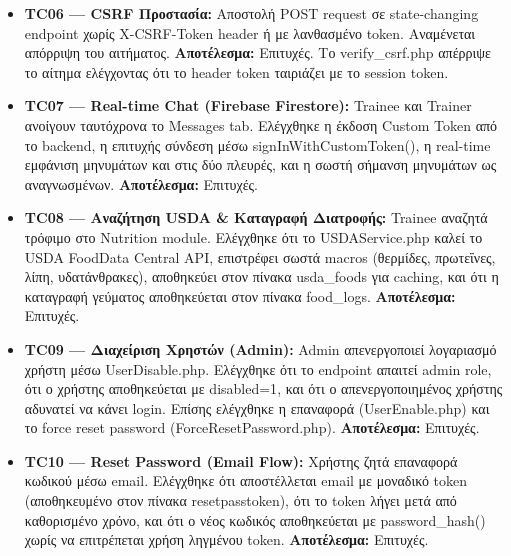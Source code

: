\documentclass[12pt,a4paper]{report}
\begin{document}
\begin{itemize}
    \item \textbf{TC06 --- CSRF Προστασία:} Αποστολή \textenglish{POST request} σε \textenglish{state-changing endpoint} χωρίς \textenglish{X-CSRF-Token header} ή με λανθασμένο \textenglish{token}. Αναμένεται απόρριψη του αιτήματος. \textbf{Αποτέλεσμα:} Επιτυχές. Το \textenglish{verify\_csrf.php} απέρριψε το αίτημα ελέγχοντας ότι το \textenglish{header token} ταιριάζει με το \textenglish{session token}.

    \item \textbf{TC07 --- Real-time Chat (Firebase Firestore):} \textenglish{Trainee} και \textenglish{Trainer} ανοίγουν ταυτόχρονα το \textenglish{Messages} tab. Ελέγχθηκε η έκδοση \textenglish{Custom Token} από το \textenglish{backend}, η επιτυχής σύνδεση μέσω \textenglish{signInWithCustomToken()}, η \textenglish{real-time} εμφάνιση μηνυμάτων και στις δύο πλευρές, και η σωστή σήμανση μηνυμάτων ως αναγνωσμένων. \textbf{Αποτέλεσμα:} Επιτυχές.

    \item \textbf{TC08 --- Αναζήτηση USDA \& Καταγραφή Διατροφής:} \textenglish{Trainee} αναζητά τρόφιμο στο \textenglish{Nutrition} module. Ελέγχθηκε ότι το \textenglish{USDAService.php} καλεί το \textenglish{USDA FoodData Central API}, επιστρέφει σωστά \textenglish{macros} (θερμίδες, πρωτεΐνες, λίπη, υδατάνθρακες), αποθηκεύει στον πίνακα \textenglish{usda\_foods} για \textenglish{caching}, και ότι η καταγραφή γεύματος αποθηκεύεται στον πίνακα \textenglish{food\_logs}. \textbf{Αποτέλεσμα:} Επιτυχές.

    \item \textbf{TC09 --- Διαχείριση Χρηστών (Admin):} \textenglish{Admin} απενεργοποιεί λογαριασμό χρήστη μέσω \textenglish{UserDisable.php}. Ελέγχθηκε ότι το \textenglish{endpoint} απαιτεί \textenglish{admin role}, ότι ο χρήστης αποθηκεύεται με \textenglish{disabled=1}, και ότι ο απενεργοποιημένος χρήστης αδυνατεί να κάνει \textenglish{login}. Επίσης ελέγχθηκε η επαναφορά (\textenglish{UserEnable.php}) και το \textenglish{force reset password (ForceResetPassword.php)}. \textbf{Αποτέλεσμα:} Επιτυχές.

    \item \textbf{TC10 --- Reset Password (Email Flow):} Χρήστης ζητά επαναφορά κωδικού μέσω \textenglish{email}. Ελέγχθηκε ότι αποστέλλεται \textenglish{email} με μοναδικό \textenglish{token} (αποθηκευμένο στον πίνακα \textenglish{resetpasstoken}), ότι το \textenglish{token} λήγει μετά από καθορισμένο χρόνο, και ότι ο νέος κωδικός αποθηκεύεται με \textenglish{password\_hash()} χωρίς να επιτρέπεται χρήση ληγμένου \textenglish{token}. \textbf{Αποτέλεσμα:} Επιτυχές.
\end{itemize}
\end{document}
